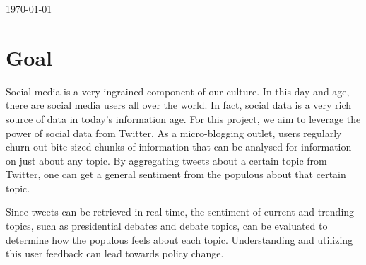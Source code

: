 \begin{titlepage}


{\large \today}\\[3cm] %


 

\vfill %

\end{titlepage}

\section{Goal}
Social media is a very ingrained component of our culture. In this day and age, there are social media users all over the world. In fact, social data is a very rich source of data in today’s information age. For this project, we aim to leverage the power of social data from Twitter. As a micro-blogging outlet, users regularly churn out bite-sized chunks of information that can be analysed for information on just about any topic. By aggregating tweets about a certain topic from Twitter, one can get a general sentiment from the populous about that certain topic. 

Since tweets can be retrieved in real time, the sentiment of current and trending topics, such as presidential debates and debate topics, can be evaluated to determine how the populous feels about each topic. Understanding and utilizing this user feedback can lead towards policy change.

